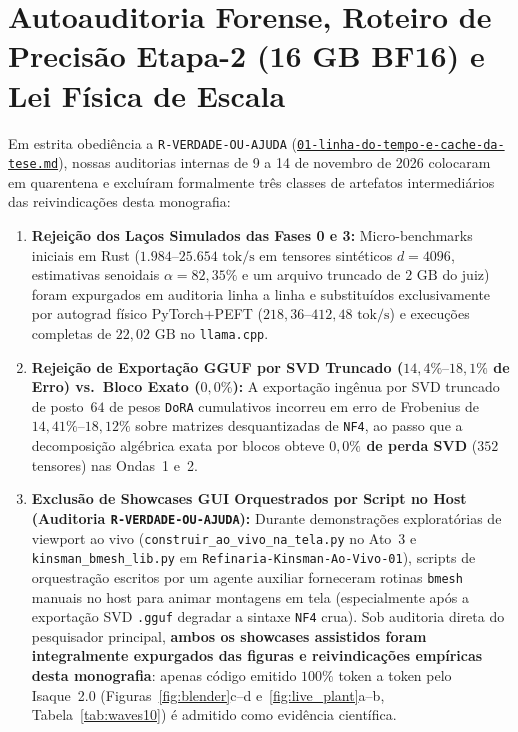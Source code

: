 \documentclass[10pt,a4paper]{article}
\begin{document}
\section{Autoauditoria Forense, Roteiro de Precis\~ao Etapa-2 (16 GB BF16) e Lei F\'isica de Escala}

Em estrita obedi\^encia a \texttt{R-VERDADE-OU-AJUDA} (\href{https://drive.google.com/file/d/16-3o4ykaOOKaW-S2VTHzpE7Uhj1BA0tl/view?usp=drivesdk}{\texttt{01-linha-do-\allowbreak{}tempo-e-cache-\allowbreak{}da-tese.md}}), nossas auditorias internas de 9 a 14 de novembro de 2026 colocaram em quarentena e exclu\'iram formalmente tr\^es classes de artefatos intermedi\'arios das reivindica\c{c}\~oes desta monografia:
\begin{enumerate}
  \item \textbf{Rejei\c{c}\~ao dos La\c{c}os Simulados das Fases 0 e 3:} Micro-benchmarks iniciais em Rust ($1.984\text{--}25.654\text{ tok/s}$ em tensores sint\'eticos $d=4096$, estimativas senoidais $\alpha=82,35\%$ e um arquivo truncado de $2\text{ GB}$ do juiz) foram expurgados em auditoria linha a linha e substitu\'idos exclusivamente por autograd f\'isico PyTorch+PEFT ($218,36\text{--}412,48\text{ tok/s}$) e execu\c{c}\~oes completas de $22,02\text{ GB}$ no \texttt{llama.cpp}.
  \item \textbf{Rejei\c{c}\~ao de Exporta\c{c}\~ao GGUF por SVD Truncado ($14,4\%\text{--}18,1\%$ de Erro) vs.\ Bloco Exato ($0,0\%$):} A exporta\c{c}\~ao ing\^enua por SVD truncado de posto~$64$ de pesos \texttt{DoRA} cumulativos incorreu em erro de Frobenius de $14,41\%\text{--}18,12\%$ sobre matrizes desquantizadas de \texttt{NF4}, ao passo que a decomposi\c{c}\~ao alg\'ebrica exata por blocos obteve \textbf{$0,0\%$ de perda SVD} ($352$ tensores) nas Ondas~1 e~2.
  \item \textbf{Exclus\~ao de Showcases GUI Orquestrados por Script no Host (Auditoria \texttt{R-VERDADE-OU-AJUDA}):} Durante demonstra\c{c}\~oes explorat\'orias de viewport ao vivo (\texttt{construir\_\allowbreak{}ao\_\allowbreak{}vivo\_\allowbreak{}na\_\allowbreak{}tela.py} no Ato~3 e \texttt{kinsman\_\allowbreak{}bmesh\_\allowbreak{}lib.py} em \texttt{Refinaria-Kinsman-Ao-Vivo-01}), scripts de orquestra\c{c}\~ao escritos por um agente auxiliar forneceram rotinas \texttt{bmesh} manuais no host para animar montagens em tela (especialmente ap\'os a exporta\c{c}\~ao SVD \texttt{.gguf} degradar a sintaxe \texttt{NF4} crua). Sob auditoria direta do pesquisador principal, \textbf{ambos os showcases assistidos foram integralmente expurgados das figuras e reivindica\c{c}\~oes emp\'iricas desta monografia}: apenas c\'odigo emitido $100\%$ token a token pelo Isaque~2.0 (Figuras~\ref{fig:blender}c--d e~\ref{fig:live_plant}a--b, Tabela~\ref{tab:waves10}) \'e admitido como evid\^encia cient\'ifica.
\end{enumerate}
\end{document}

